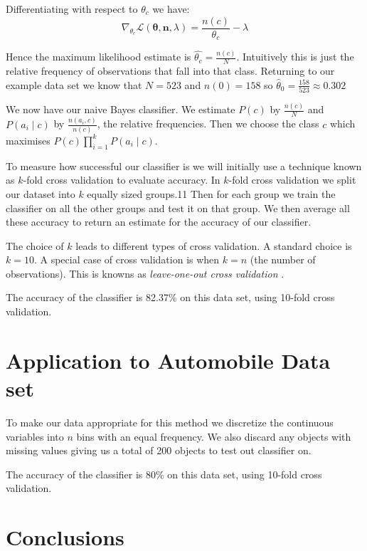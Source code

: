 Differentiating with respect to $\theta_c$ we have:
\begin{equation}
	\nabla_{\theta_c} \mathcal{L}(\mathbf{\theta}, \mathbf{n}, \lambda) = \frac{n(c)}{\theta_c} - \lambda
\end{equation}

Hence the maximum likelihood estimate is $\hat{\theta_c} = \frac{n(c)}{N}$.
Intuitively this is just the relative frequency of observations that fall into that class.
Returning to our example data set we know that $N=523$ and $n(0)=158$ so $\hat\theta_0 = \frac{158}{523} \approx 0.302$

We now have our naive Bayes classifier.
We estimate $P(c)$ by $\frac{n(c)}{N}$ and $P(a_i \mid c)$ by $\frac{n(a_i, c)}{n(c)}$, the relative frequencies.
Then we choose the class $c$ which maximises $P(c)\prod_{i=1}^{k}P(a_i \mid c)$.

To measure how successful our classifier is we will initially use a technique known as $k$-fold cross validation to evaluate accuracy.
In $k$-fold cross validation we split our dataset into $k$ equally sized groups.11
Then for each group we train the classifier on all the other groups and test it on that group.
We then average all these accuracy to return an estimate for the accuracy of our classifier.

The choice of $k$ leads to different types of cross validation.
A standard choice is $k=10$. A special case of cross validation is when $k=n$ (the number of observations).
This is knowns as \textit{leave-one-out cross validation} \cite{Priddy05}.

The accuracy of the classifier is 82.37\% on this data set, using 10-fold cross validation.

\section{Application to Automobile Data set}

To make our data appropriate for this method we discretize the continuous variables into $n$ bins with an equal frequency.
We also discard any objects with missing values giving us a total of 200 objects to test out classifier on.

The accuracy of the classifier is 80\% on this data set, using 10-fold cross validation.

\section{Conclusions}

